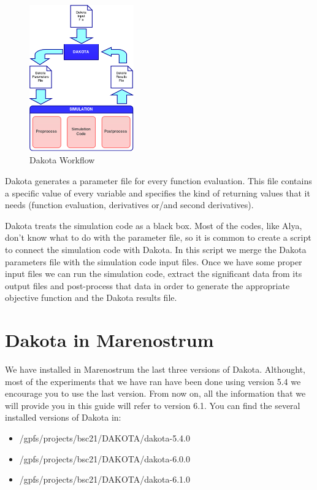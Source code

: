 \documentclass[12pt,a4paper,article]{memoir} %
\begin{document}
\begin{figure}[htb!]
  \centering
    \includegraphics[width=0.4\textwidth]{DakotaWorkflow}
  \caption{Dakota Workflow}
  \label{fig:Workflow}
\end{figure}

Dakota generates a parameter file for every function evaluation. This file contains a specific value of every variable and specifies the kind of returning values that it needs (function evaluation, derivatives or/and second derivatives).

Dakota treats the simulation code as a black box. Most of the codes, like Alya, don't know what to do with the parameter file, so it is common to create a script to connect the simulation code with Dakota. In this script we merge the Dakota parameters file with the simulation code input files. Once we have some proper input files we can run the simulation code, extract the significant data from its output files and post-process that data in order to generate the appropriate objective function and the Dakota results file.

\chapter{Dakota in Marenostrum}

We have installed in Marenostrum the last three versions of Dakota. Althought, most of the experiments that we have ran have been done using version 5.4 we encourage you to use the last version. From now on, all the information that we will provide you in this guide will refer to version 6.1. You can find the several installed versions of Dakota in:

\begin{itemize}
\item /gpfs/projects/bsc21/DAKOTA/dakota-5.4.0
\item /gpfs/projects/bsc21/DAKOTA/dakota-6.0.0
\item /gpfs/projects/bsc21/DAKOTA/dakota-6.1.0
\end{itemize}
\end{document}
